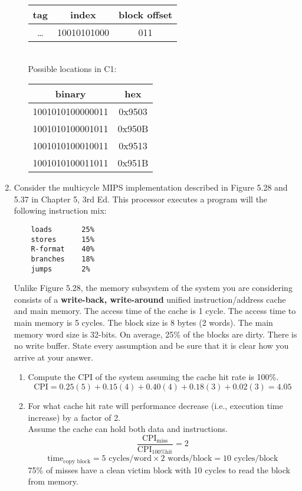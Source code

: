 \documentclass[10pt,letterpaper]{article}
\begin{document}
\begin{enumerate}[label=\textbf{Problem \arabic*.}]
\begin{enumerate}[label=\Alph*)]
	\begin{tabular}{|c|c|c|}
	\hline
	\textbf{tag} & \textbf{index} & \textbf{block offset}\\
	\hline
	\dots & 10010101000 & 011 \\
	\hline
	\end{tabular}\\
	Possible locations in C1:
	\begin{tabular}{|c|c|}
	\hline
	\textbf{binary} & \textbf{hex} \\
	\hline
	1001010100000011 & 0x9503\\
	\hline
	1001010100001011 & 0x950B\\
	\hline
	1001010100010011 & 0x9513\\
	\hline
	1001010100011011 & 0x951B\\
	\hline
	\end{tabular}
	\end{enumerate}
\item Consider the multicycle MIPS implementation described in Figure 5.28 and 5.37 in Chapter 5, 3rd Ed. This processor executes a program will the following instruction mix:
	\begin{lstlisting}
	loads		25%
	stores		15%
	R-format	40%
	branches	18%
	jumps		2%
	\end{lstlisting}
Unlike Figure 5.28, the memory subsystem of the system you are considering consists of a \textbf{write-back, write-around} unified instruction/address cache and main memory. The access time of the cache is 1 cycle. The access time to main memory is 5 cycles. The block size is 8 bytes (2 words). The main memory word size is 32-bits. On average, 25\% of the blocks are dirty. There is no write buffer. State every assumption and be sure that it is clear how you arrive at your answer.
	\begin{enumerate}[label=\Alph*)]
	\item Compute the CPI of the system assuming the cache hit rate is 100\%.
	\[\text{CPI} = 0.25(5) + 0.15(4) + 0.40(4) + 0.18(3)+ 0.02(3) = \boxed{4.05}\]
	\item For what cache hit rate will performance decrease (i.e., execution time increase) by a factor of 2.\\
	Assume the cache can hold both data and instructions.
	\[\frac{\text{CPI}_{\text{miss}}}{\text{CPI}_{\text{100\% hit}}}=2\]
	\[\text{time}_{\text{copy block}} = 5 \text{ cycles/word} \times 2 \text{ words/block} = 10 \text{ cycles/block}\]
	75\% of misses have a clean victim block with 10 cycles to read the block from memory.

\end{enumerate}
\end{enumerate}
\end{document}
